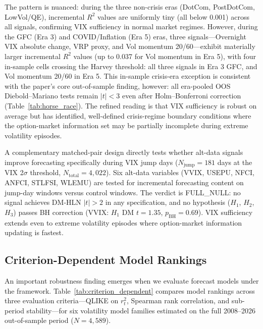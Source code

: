 \documentclass[12pt,a4paper]{article}
\begin{document}
The pattern is nuanced: during the three non-crisis eras (DotCom, PostDotCom, LowVol/QE), incremental $R^2$ values are uniformly tiny (all below 0.001) across all signals, confirming VIX sufficiency in normal market regimes. However, during the GFC (Era 3) and COVID/Inflation (Era 5) eras, three signals---Overnight VIX absolute change, VRP proxy, and Vol momentum 20/60---exhibit materially larger incremental $R^2$ values (up to 0.037 for Vol momentum in Era 5), with four in-sample cells crossing the Harvey threshold: all three signals in Era 3 GFC, and Vol momentum 20/60 in Era 5. This in-sample crisis-era exception is consistent with the paper's core out-of-sample finding, however: all era-pooled OOS Diebold--Mariano tests remain $|t|<3$ even after Holm--Bonferroni correction (Table~\ref{tab:horse_race}). The refined reading is that VIX sufficiency is robust on average but has identified, well-defined crisis-regime boundary conditions where the option-market information set may be partially incomplete during extreme volatility episodes.

A complementary matched-pair design directly tests whether alt-data signals improve forecasting specifically during VIX jump days ($N_{\text{jump}} = 181$ days at the VIX 2$\sigma$ threshold, $N_{\text{total}} = 4{,}022$). Six alt-data variables (VVIX, USEPU, NFCI, ANFCI, STLFSI, WLEMU) are tested for incremental forecasting content on jump-day windows versus control windows. The verdict is FULL\_NULL: no signal achieves DM-HLN $|t|>2$ in any specification, and no hypothesis ($H_1$, $H_2$, $H_3$) passes BH correction (VVIX: $H_1$ DM $t = 1.35$, $p_{\text{BH}} = 0.69$). VIX sufficiency extends even to extreme volatility episodes where option-market information updating is fastest.

\subsection{Criterion-Dependent Model Rankings}
\label{sec:criterion_dependent}

An important robustness finding emerges when we evaluate forecast models under the \citet{patton2011} framework. Table~\ref{tab:criterion_dependent} compares model rankings across three evaluation criteria---QLIKE on $r_t^2$, Spearman rank correlation, and sub-period stability---for six volatility model families estimated on the full 2008--2026 out-of-sample period ($N = 4{,}589$).
\end{document}
